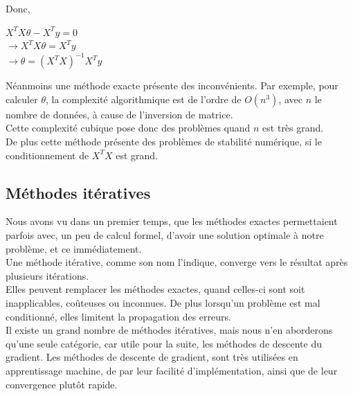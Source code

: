 \documentclass[10pt,a4paper]{report}
\begin{document}
			Donc,
			\begin{center}
				$X^TX\theta-X^Ty = 0$\\
				$\rightarrow X^TX\theta = X^Ty$\\
				$\rightarrow \theta = (X^TX)^{-1} X^Ty$
			\end{center}
			Néanmoins une méthode exacte présente des inconvénients.
			Par exemple, pour calculer $\theta$, la complexité algorithmique est de l'ordre de $O(n^3)$, avec $n$ le nombre de données, à cause de l'inversion de matrice.\\
			Cette complexité cubique pose donc des problèmes quand $n$ est très grand.\\
			De plus cette méthode présente des problèmes de stabilité numérique, si le conditionnement de $X^TX$ est grand.
		
		\subsection{Méthodes itératives}
		Nous avons vu dans un premier temps, que les méthodes exactes permettaient parfois avec, un peu de calcul formel, d'avoir une solution optimale à notre problème, et ce immédiatement.\\
		Une méthode itérative, comme son nom l'indique, converge vers le résultat après plusieurs itérations.\\
		Elles peuvent remplacer les méthodes exactes, quand celles-ci sont soit inapplicables, coûteuses ou inconnues. De plus lorsqu'un problème est mal conditionné, elles limitent la propagation des erreurs.\\
		Il existe un grand nombre de méthodes itératives, mais nous n'en aborderons qu'une seule catégorie, car utile pour la suite, les méthodes de descente du gradient.
		Les méthodes de descente de gradient, sont très utilisées en apprentissage machine, de par leur facilité d'implémentation, ainsi que de leur convergence plutôt rapide.\\
\end{document}
